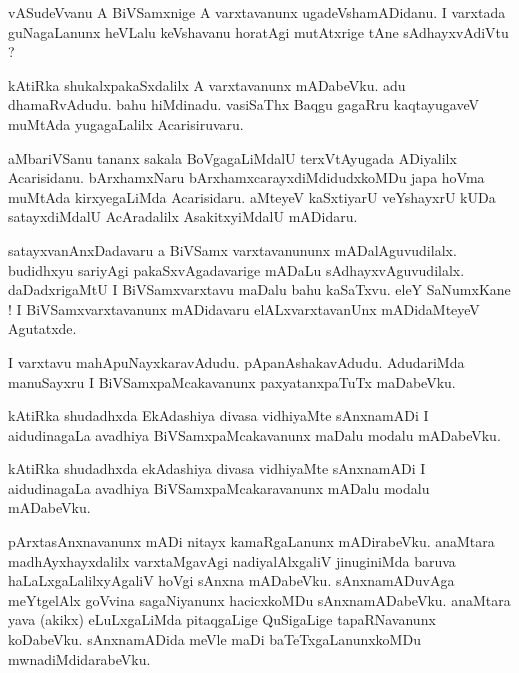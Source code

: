 \documentclass{article}
\begin{document}
\begin{mn}%
vASudeVvanu A BiVSamxnige A varxtavanunx ugadeVshamADidanu. I varxtada guNagaLanunx heVLalu 
keVshavanu horatAgi mutAtxrige tAne sAdhayxvAdiVtu ?
\end{mn}

\begin{mn}%
kAtiRka shukalxpakaSxdalilx A varxtavanunx mADabeVku. adu dhamaRvAdudu. bahu hiMdinadu. vasiSaThx 
Baqgu gagaRru kaqtayugaveV muMtAda yugagaLalilx Acarisiruvaru.
\end{mn}

\begin{mn}%
aMbariVSanu tananx sakala BoVgagaLiMdalU terxVtAyugada ADiyalilx Acarisidanu. bArxhamxNaru 
bArxhamxcarayxdiMdidudxkoMDu japa hoVma muMtAda kirxyegaLiMda Acarisidaru. aMteyeV kaSxtiyarU 
veYshayxrU kUDa satayxdiMdalU AcAradalilx AsakitxyiMdalU mADidaru.
\end{mn}

\begin{mn}%
satayxvanAnxDadavaru a BiVSamx varxtavanununx mADalAguvudilalx. budidhxyu sariyAgi 
pakaSxvAgadavarige mADaLu sAdhayxvAguvudilalx. daDadxrigaMtU I BiVSamxvarxtavu maDalu bahu 
kaSaTxvu. eleY SaNumxKane ! I BiVSamxvarxtavanunx mADidavaru elALxvarxtavanUnx mADidaMteyeV 
Agutatxde.
\end{mn}

\begin{mn}%
I varxtavu mahApuNayxkaravAdudu. pApanAshakavAdudu. AdudariMda manuSayxru I BiVSamxpaMcakavanunx 
paxyatanxpaTuTx maDabeVku.
\end{mn}

\begin{mn}%
kAtiRka shudadhxda EkAdashiya divasa vidhiyaMte sAnxnamADi I aidudinagaLa avadhiya 
BiVSamxpaMcakavanunx maDalu modalu mADabeVku.
\end{mn}

\begin{mn}%
kAtiRka shudadhxda ekAdashiya divasa vidhiyaMte sAnxnamADi I aidudinagaLa avadhiya 
BiVSamxpaMcakaravanunx mADalu modalu mADabeVku.
\end{mn}

\begin{mn}%
pArxtasAnxnavanunx mADi nitayx kamaRgaLanunx mADirabeVku. anaMtara madhAyxhayxdalilx varxtaMgavAgi 
nadiyalAlxgaliV jinuginiMda baruva haLaLxgaLalilxyAgaliV hoVgi sAnxna mADabeVku. sAnxnamADuvAga 
meYtgelAlx goVvina sagaNiyanunx hacicxkoMDu sAnxnamADabeVku. anaMtara yava (akikx) eLuLxgaLiMda 
pitaqgaLige QuSigaLige tapaRNavanunx koDabeVku. sAnxnamADida meVle maDi baTeTxgaLanunxkoMDu 
mwnadiMdidarabeVku.
\end{mn}
\end{document}
